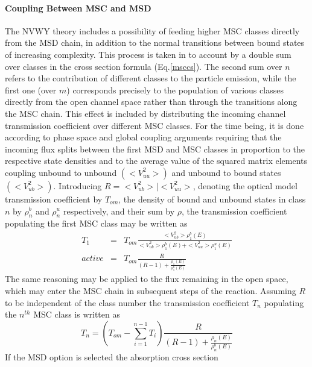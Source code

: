 \documentclass[twocolumn,amsmath,amssymb,10pt,groupedaddress,a4paper]{revtex4}
\begin{document}
\paragraph{Coupling Between MSC and MSD}
The NVWY theory includes a possibility of feeding higher
MSC classes directly from the MSD chain, in addition to
the normal transitions between bound states of increasing complexity.
This process is taken in to account by a double sum over classes in
the cross section formula (Eq.\ref{msccs}). The second sum over $n$
refers to the contribution of different classes to the particle emission,
while the first one (over $m$) corresponds precisely to the population
of various classes directly from the open channel space rather than
through the transitions along the MSC chain. This effect is included
by distributing the incoming channel transmission
coefficient over different MSC classes. For the time being,
it is done according to phase space and global coupling arguments
requiring that the incoming flux splits between the first MSD
and MSC classes in proportion to the respective state densities and
to the average value of the squared matrix elements coupling unbound
to unbound $(<V_{uu}^{2}>)$ and unbound to bound states $(<V_{ub}^{2}>)$.
Introducing $R=<V_{ub}^{2}>\mid<V_{uu}^{2}>$, denoting the optical
model transmission coefficient by $T_{om}$, the density of bound
and unbound states in class $n$ by $\rho_{n}^{b}$ and $\rho_{n}^{u}$
respectively, and their sum by $\rho$, the transmission coefficient
populating the first MSC class may be written as
\begin{eqnarray}
T_{1}&=&T_{om}\frac{<V_{ub}^{2}>\rho_{1}^{b}(E)}{<V_{ub}^{2}>\rho_{1}^{b}(E)+<V_{uu}^{2}>\rho_{1}^{u}(E)}\nonumber\\active
&=&T_{om}\frac{R}{(R-1)+\frac{\rho_{1}(E)}{\rho_{1}^{b}(E)}}\label{eq9}
\end{eqnarray}
The same reasoning may be applied to the flux remaining in the open
space, which may enter the MSC chain in subsequent steps
of the reaction. Assuming $R$ to be independent of the class number
the transmission coefficient $T_{n}$ populating the $n^{th}$ MSC
class is written as
\begin{equation}
T_{n}=\left(T_{om}-\sum_{i=1}^{n-1}T_{i}\right)\frac{R}{(R-1)+\frac{\rho_{n}(E)}{\rho_{n}^{b}(E)}}\label{eq10}\end{equation}
If the MSD option is selected the absorption cross section
\end{document}
